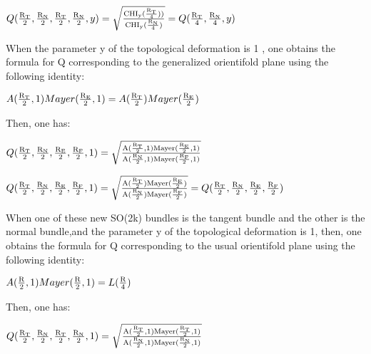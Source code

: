 \documentclass[a4paper,a4paper]{article}
\begin{document}
\begin{center}
{  $ Q(\frac{\rm R_T}{\rm 2},\frac{\rm R_N}{\rm 2},\frac{\rm R_T}{\rm 2},\frac{\rm R_N}{\rm 2},y) =\sqrt{\frac{\rm CHI_y(\frac{\rm R_T}{\rm 4}) )}{\rm CHI_y(\frac{\rm R_N}{\rm 4})}}=Q(\frac{\rm R_T}{\rm 4},\frac{\rm R_N}{\rm 4},y) $ }
\end{center}
When the parameter y of the topological deformation is 1 , one obtains the  formula for Q corresponding to the generalized orientifold plane using the following identity:
\begin{center}
 
{  $A(\frac{\rm R_T}{\rm 2},1)Mayer(\frac{\rm R_E}{\rm 2},1) 
 =A(\frac{\rm R_T}{\rm 2})Mayer(\frac{\rm R_E}{\rm 2}) $}
\end{center}
Then, one has:

\begin{center}
{  $ Q(\frac{\rm R_T}{\rm 2},\frac{\rm R_N}{\rm 2},\frac{\rm R_E}{\rm 2},\frac{\rm R_F}{\rm 2},1) =\sqrt{\frac{\rm A(\frac{\rm R_T}{\rm 2},1)Mayer(\frac{\rm R_E}{\rm 2},1)}{\rm A(\frac{\rm R_N}{\rm 2},1)Mayer(\frac{\rm R_F}{\rm 2},1)}} $ }
\end{center}

\begin{center}
{  $ Q(\frac{\rm R_T}{\rm 2},\frac{\rm R_N}{\rm 2},\frac{\rm R_E}{\rm 2},\frac{\rm R_F}{\rm 2},1) =\sqrt{\frac{\rm A(\frac{\rm R_T}{\rm 2})Mayer(\frac{\rm R_E}{\rm 2})}{\rm A(\frac{\rm R_N}{\rm 2})Mayer(\frac{\rm R_F}{\rm 2})}}=Q(\frac{\rm R_T}{\rm 2},\frac{\rm R_N}{\rm 2},\frac{\rm R_E}{\rm 2},\frac{\rm R_F}{\rm 2}) $ }
\end{center}

When one of these new SO(2k) bundles is the tangent bundle and the other is the normal bundle,and the parameter y of the topological deformation is 1, then, one obtains the  formula for Q corresponding to the usual orientifold plane using the following identity:
\begin{center}

 
{  $A(\frac{\rm R}{\rm 2},1)Mayer(\frac{\rm R}{\rm 2},1) 
 = L(\frac{\rm R}{\rm 4})$}
\end{center}

Then, one has:

\begin{center}
{  $ Q(\frac{\rm R_T}{\rm 2},\frac{\rm R_N}{\rm 2},\frac{\rm R_T}{\rm 2},\frac{\rm R_N}{\rm 2},1) =\sqrt{\frac{\rm A(\frac{\rm R_T}{\rm 2},1)Mayer(\frac{\rm R_T}{\rm 2},1)}{\rm A(\frac{\rm R_N}{\rm 2},1)Mayer(\frac{\rm R_N}{\rm 2},1)}} $ }
\end{center}
\end{document}
